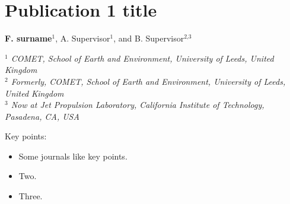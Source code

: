 \onehalfspacing
\chapter[Publication 1 title]{Publication 1 title}
\label{ch:publication1}
\begin{center}
 \large{\textbf{F. surname}$^{\text{1}}$, A. Supervisor$^{\text{1}}$, and B. Supervisor$^{\text{2,3}}$  }  \\
\end{center}
\begin{center}
\textit{
$^{\text{1}}$ COMET, School of Earth and Environment, University of Leeds, United Kingdom\\
$^{\text{2}}$ Formerly, COMET, School of Earth and Environment, University of Leeds, United Kingdom\\
$^{\text{3}}$ Now at Jet Propulsion Laboratory, California Institute of Technology, Pasadena, CA, USA\\
}
\end{center}

\newpage
Key points:
\begin{itemize}
\item Some journals like key points.
\item Two.
\item Three.
\end{itemize}



